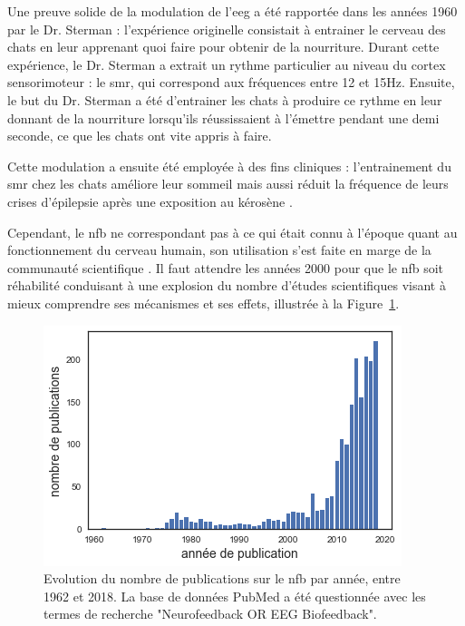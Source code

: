 Une preuve solide de la modulation de l'\gls{eeg} a été rapportée dans les années 1960 par le Dr. Sterman : l'expérience 
originelle consistait à entrainer le cerveau des chats en leur apprenant quoi faire pour obtenir de 
la nourriture. Durant cette expérience, le Dr. Sterman a extrait un rythme particulier au niveau du cortex sensorimoteur : le \gls{smr}, qui correspond 
aux fréquences entre 12 et 15Hz. Ensuite, le but du Dr. Sterman a été d'entrainer les chats à produire ce rythme en leur donnant de la nourriture 
lorsqu'ils réussissaient à l'émettre pendant une demi seconde, ce que les chats ont vite appris à faire. 

Cette modulation a ensuite été employée à des fins cliniques : l'entrainement du \gls{smr} chez les chats améliore leur sommeil \citep{Sterman1970} mais aussi
réduit la fréquence de leurs crises d'épilepsie après une exposition au kérosène \citep{Sterman1974}. 

Cependant, le \gls{nfb} ne correspondant pas à ce qui 
était connu à l'époque quant au fonctionnement du cerveau humain, son utilisation s'est faite en marge de la communauté scientifique \citep{Masterpasqua2003}. 
Il faut attendre les années 2000 pour que le \gls{nfb} soit réhabilité conduisant à une explosion du nombre d'études scientifiques visant à mieux comprendre 
ses mécanismes et ses effets, illustrée à la Figure~\ref{Figure:introduction_number_of_nfb_publications}. 

\begin{figure}[h!]
  \centering
	\includegraphics[width=0.7\linewidth]{figures/chapter-1/introduction-number-of-nfb-publications} 
  \caption{Evolution du nombre de publications sur le \gls{nfb} par année, entre 1962 et 2018. La base de données PubMed a été questionnée avec les 
	termes de recherche "Neurofeedback OR EEG Biofeedback".}
  \label{Figure:introduction_number_of_nfb_publications}
\end{figure}

